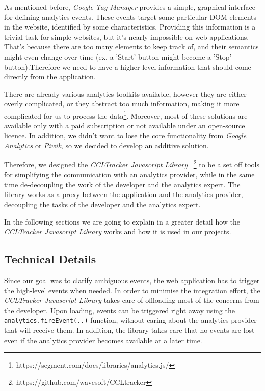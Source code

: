 
\newcommand{\CCLTrackerJS}{ \emph{CCLTracker Javascript Library} }


As mentioned before, \emph{Google Tag Manager} provides a simple, graphical interface for defining analytics events. These events target some particular DOM elements in the website, identified by some characteristics. Providing this information is a trivial task for simple websites, but it's nearly impossible on web applications. That's because there are too many elements to keep track of, and their semantics might even change over time (ex. a 'Start' button might become a 'Stop' button).Therefore we need to have a higher-level information that should come directly from the application. 

There are already various analytics toolkits available, however they are either overly complicated, or they abstract too much information, making it more complicated for us to process the data\footnote{https://segment.com/docs/libraries/analytics.js/}. Moreover, most of these solutions are available only with a paid subscription or not available under an open-source licence. In addition, we didn't want to lose the core functionality from \emph{Google Analytics} or \emph{Piwik}, so we decided to develop an additive solution.

Therefore, we designed the \CCLTrackerJS~\footnote{https://github.com/wavesoft/CCLtracker} to be a set off tools for simplifying the communication with an analytics provider, while in the same time de-decoupling the work of the developer and the analytics expert. The library works as a proxy between the application and the analytics provider, decoupling the tasks of the developer and the analytics expert.

In the following sections we are going to explain in a greater detail how the \CCLTrackerJS works and how it is used in our projects.

\subsection{Technical Details}

Since our goal was to clarify ambiguous events, the web application has to trigger the high-level events when needed. In order to minimise the integration effort, the \CCLTrackerJS takes care of offloading most of the concerns from the developer. Upon loading, events can be triggered right away using the \texttt{analytics.fireEvent(..)} function, without caring about the analytics provider that will receive them. In addition, the library takes care that no events are lost even if the analytics provider becomes available at a later time.

